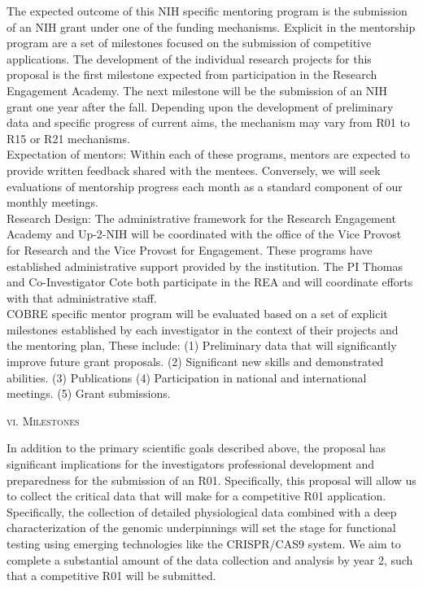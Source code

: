 \documentclass[11pt]{article}
\begin{document}
The expected outcome of this NIH specific mentoring program is the submission of an NIH grant under one of the funding mechanisms.  Explicit in the mentorship program are a set of milestones focused on the submission of competitive applications.  The development of the individual research projects for this proposal is the first milestone expected from participation in the Research Engagement Academy.  The next milestone will be the submission of an NIH grant one year after the fall.  Depending upon the development of preliminary data and specific progress of current aims, the mechanism may vary from R01 to R15 or R21 mechanisms.  \\

Expectation of mentors: Within each of these programs, mentors are expected to provide written feedback shared with the mentees.  Conversely, we will seek evaluations of mentorship progress each month as a standard component of our monthly meetings. \\ 

Research Design:
The administrative framework for the Research Engagement Academy and Up-2-NIH will be coordinated with the office of the Vice Provost for Research and the Vice Provost for Engagement.  These programs have established administrative support provided by the institution.  The PI Thomas and Co-Investigator Cote both participate in the REA and will coordinate efforts with that administrative staff. \\

COBRE specific mentor program will be evaluated based on a set of explicit milestones established by each investigator in the context of their projects and the mentoring plan, These include: (1) Preliminary data that will significantly improve future grant proposals. (2) Significant new skills and demonstrated abilities. (3) Publications (4) Participation in national and international meetings. (5) Grant submissions.

\normalsize 
\begin{center}
\textsc{{vi. Milestones}} \\
\end{center}

In addition to the primary scientific goals described above, the proposal has significant implications for the investigators professional development and preparedness for the submission of an R01.  Specifically, this proposal will allow us to collect the critical data that will make for a competitive R01 application. Specifically, the collection of detailed physiological data combined with a deep characterization of the genomic underpinnings will set the stage for functional testing using emerging technologies like the CRISPR/CAS9 system. We aim to complete a substantial amount of the data collection and analysis by year 2, such that a competitive R01 will be submitted. \\  
\end{document}
